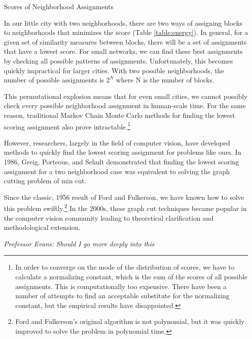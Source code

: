 \begin{table}[h]

\caption{Scores of Neighborhood Assignments}
\label{table:energy}
\end{table}

In our little city with two neighborhoods, there are two ways of
assigning blocks to neighborhoods that minimizes the score (Table
\ref{table:energy}). In general, for a given set of similarity
measures between blocks, there will be a set of assignments that have
a lowest score. For small networks, we can find these best assignments
by checking all possible patterns of assignments. Unfortunately, this
becomes quickly impractical for larger cities. With two possible
neighborhoods, the number of possible assignments is $2^N$ where N is
the number of blocks.

This permutational explosion means that for even small cities, we
cannot possibly check every possible neighborhood assignment in
human-scale time. For the same reason, traditional Markov Chain Monte
Carlo methods for finding the lowest scoring assignment also prove
intractable.\footnote{In order to converge on the mode of the
  distribution of scores, we have to calculate a normalizing constant,
  which is the sum of the scores of all possible assignments. This is
  computationally too expensive. There have been a number of attempts
  to find an acceptable substitute for the normalizing constant, but
  the empirical results have disappointed.\cite{li_mrf_2009}}

However, researchers, largely in the field of computer vision, have
developed methods to quickly find the lowest scoring assignment for
problems like ours. In 1986, Greig, Porteous, and Sehult demonstrated
that finding the lowest scoring assignment for a two neighborhood case
was equivalent to solving the graph cutting problem of min
cut.\cite{greig_exact_1989}

 Since the classic, 1956 result of Ford and Fulkerson, we have known
 how to solve this problem swiftly.\footnote{Ford and Fulkerson's
   original algorithm is not polynomial, but it was quickly improved
   to solve the problem in polynomial time.\cite{ford_maximal_1956}}
 In the 2000s, these graph cut techniques became popular in the
 computer vision community leading to theoretical
 clarification and methodological extension.\cite{kolmogorov_what_2004}

\emph{Professor Evans: Should I go more deeply into this}

